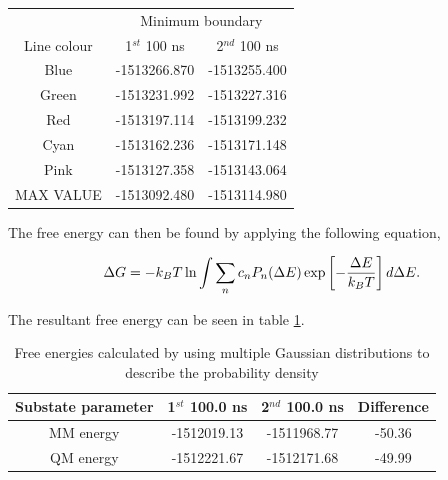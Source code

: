 \begin{table}[ht]
  \begin{center}
  \begin{tabular}{c c c}
 & \multicolumn{2}{c}{Minimum boundary} \\
 Line colour & 1$^{st}$ 100 ns & 2$^{nd}$ 100 ns \\
 Blue & -1513266.870 & -1513255.400 \\
 Green & -1513231.992 & -1513227.316 \\
 Red & -1513197.114 & -1513199.232 \\
 Cyan & -1513162.236 & -1513171.148 \\
 Pink & -1513127.358 & -1513143.064 \\
 MAX VALUE & -1513092.480 & -1513114.980 \\
 \end{tabular}
 \end{center}
\end{table}

The free energy can then be found by applying the following equation,

\begin{equation}
\ \Delta G = -k_B T \ln \int \sum_n c_n P_n (\Delta E) \exp \left[- \frac{\Delta E}{k_BT}  \right] d \Delta E \\.
\end{equation}

The resultant free energy can be seen in table \ref{table:multi_gauss_free_energy}.

\begin{table}[ht]
 \caption{Free energies calculated by using multiple Gaussian distributions to describe the probability density}
  \begin{center}
  \begin{tabular}{c|c|c|c}
   \hline\hline
Substate parameter & 1$^{st}$ 100.0 ns & 2$^{nd}$ 100.0 ns & Difference \\
 \hline
MM energy & -1512019.13 & -1511968.77 & -50.36 \\
 \hline
QM energy & -1512221.67 & -1512171.68 & -49.99 \\
 \end{tabular}\label{table:multi_gauss_free_energy}
 \end{center}
\end{table}

